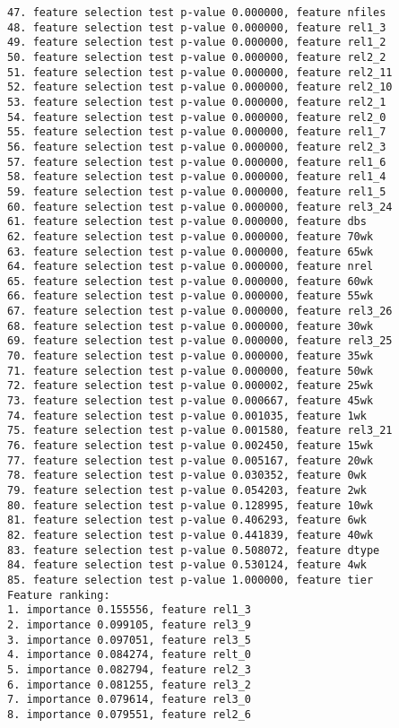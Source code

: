 \begin{verbatim}
47. feature selection test p-value 0.000000, feature nfiles
48. feature selection test p-value 0.000000, feature rel1_3
49. feature selection test p-value 0.000000, feature rel1_2
50. feature selection test p-value 0.000000, feature rel2_2
51. feature selection test p-value 0.000000, feature rel2_11
52. feature selection test p-value 0.000000, feature rel2_10
53. feature selection test p-value 0.000000, feature rel2_1
54. feature selection test p-value 0.000000, feature rel2_0
55. feature selection test p-value 0.000000, feature rel1_7
56. feature selection test p-value 0.000000, feature rel2_3
57. feature selection test p-value 0.000000, feature rel1_6
58. feature selection test p-value 0.000000, feature rel1_4
59. feature selection test p-value 0.000000, feature rel1_5
60. feature selection test p-value 0.000000, feature rel3_24
61. feature selection test p-value 0.000000, feature dbs
62. feature selection test p-value 0.000000, feature 70wk
63. feature selection test p-value 0.000000, feature 65wk
64. feature selection test p-value 0.000000, feature nrel
65. feature selection test p-value 0.000000, feature 60wk
66. feature selection test p-value 0.000000, feature 55wk
67. feature selection test p-value 0.000000, feature rel3_26
68. feature selection test p-value 0.000000, feature 30wk
69. feature selection test p-value 0.000000, feature rel3_25
70. feature selection test p-value 0.000000, feature 35wk
71. feature selection test p-value 0.000000, feature 50wk
72. feature selection test p-value 0.000002, feature 25wk
73. feature selection test p-value 0.000667, feature 45wk
74. feature selection test p-value 0.001035, feature 1wk
75. feature selection test p-value 0.001580, feature rel3_21
76. feature selection test p-value 0.002450, feature 15wk
77. feature selection test p-value 0.005167, feature 20wk
78. feature selection test p-value 0.030352, feature 0wk
79. feature selection test p-value 0.054203, feature 2wk
80. feature selection test p-value 0.128995, feature 10wk
81. feature selection test p-value 0.406293, feature 6wk
82. feature selection test p-value 0.441839, feature 40wk
83. feature selection test p-value 0.508072, feature dtype
84. feature selection test p-value 0.530124, feature 4wk
85. feature selection test p-value 1.000000, feature tier
Feature ranking:
1. importance 0.155556, feature rel1_3
2. importance 0.099105, feature rel3_9
3. importance 0.097051, feature rel3_5
4. importance 0.084274, feature relt_0
5. importance 0.082794, feature rel2_3
6. importance 0.081255, feature rel3_2
7. importance 0.079614, feature rel3_0
8. importance 0.079551, feature rel2_6

\end{verbatim}
